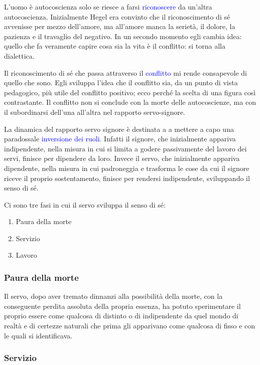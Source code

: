 \documentclass[a4paper, twoside, titlepage]{book}
\renewcommand{\emph}[1]{\textcolor{blue}{#1}}
\begin{document}
L'uomo è autocoscienza solo se riesce a farsi \emph{riconoscere} da un'altra autocoscienza. Inizialmente Hegel era convinto che il riconoscimento di sé avvenisse per mezzo dell’amore, ma all'amore manca la serietà, il dolore, la pazienza e il travaglio del negativo. In un secondo momento egli cambia idea: quello che fa veramente capire cosa sia la vita è il conflitto: si torna alla dialettica.

Il riconoscimento di sé che passa attraverso il \emph{conflitto} mi rende consapevole di quello che sono. Egli sviluppa l’idea che il conflitto sia, da un punto di vista pedagogico, più utile del conflitto positivo; ecco perché la scelta di una figura così contrastante.
Il conflitto non si conclude con la morte delle autocoscienze, ma con il subordinarsi dell'una all'altra nel rapporto servo-signore.

La dinamica del rapporto servo signore è destinata a a mettere a capo una paradossale \emph{inversione dei ruoli}. Infatti il signore, che inizialmente appariva indipendente, nella misura in cui si limita a godere passivamente del lavoro dei servi, finisce per dipendere da loro. Invece il servo, che inizialmente appariva dipendente, nella misura in cui padroneggia e trasforma le cose da cui il signore riceve il proprio sostentamento, finisce per rendersi indipendente, sviluppando il senso di sé.

Ci sono tre fasi in cui il servo sviluppa il senso di sé:
\begin{enumerate}
\item Paura della morte
\item Servizio
\item Lavoro
\end{enumerate}

\subsubsection{Paura della morte}

Il servo, dopo aver tremato dinnanzi alla possibilità della morte, con la conseguente perdita assoluta della propria essenza, ha potuto sperimentare il proprio essere come qualcosa di distinto o di indipendente da quel mondo di realtà e di certezze naturali che prima gli apparivano come qualcosa di fisso e con le quali si identificava.

\subsubsection{Servizio}
\end{document}
